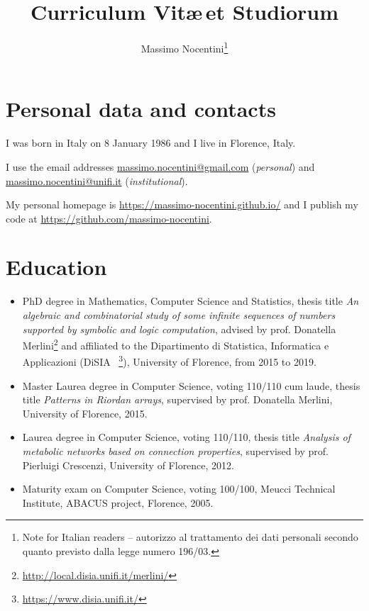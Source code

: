 \documentclass[a4paper]{article} %
\begin{document}
    \title{Curriculum Vit\ae\,et Studiorum}

    \author{Massimo Nocentini\footnote{Note for Italian readers -- autorizzo al trattamento dei dati
		 	personali secondo quanto previsto dalla legge numero 196/03.}
    }

    \maketitle

    \section{Personal data and contacts}
    
    I was born in Italy on 8 January 1986 and I live in Florence, Italy. 

	I use the email addresses \url{massimo.nocentini@gmail.com} (\emph{personal}) and
	\url{massimo.nocentini@unifi.it} (\emph{institutional}).

	My personal homepage is \url{https://massimo-nocentini.github.io/}
	and I publish my code at \url{https://github.com/massimo-nocentini}.


    \section{Education}

    \begin{itemize}
        \item PhD degree in Mathematics, Computer Science and Statistics,
        thesis title \emph{An algebraic and combinatorial study of some
        infinite sequences of numbers supported by symbolic and logic
        computation}, advised by prof.  Donatella
        Merlini\footnote{\url{http://local.disia.unifi.it/merlini/}} and
        affiliated to the Dipartimento di Statistica, Informatica e
        Applicazioni (DiSIA~ \footnote{\url{https://www.disia.unifi.it/}}),
        University of Florence, from 2015 to 2019.
        \item Master Laurea degree in Computer Science, voting 110/110 cum laude, thesis title \emph{Patterns in Riordan arrays}, 
            supervised by prof. Donatella Merlini, University of Florence, 2015.
        \item Laurea degree in Computer Science, voting 110/110, thesis title \emph{Analysis of metabolic networks based on connection properties}, 
            supervised by prof. Pierluigi Crescenzi, University of Florence, 2012.
        \item Maturity exam on Computer Science, voting 100/100, Meucci Technical Institute, ABACUS project, Florence, 2005.
    \end{itemize}
\end{document}
